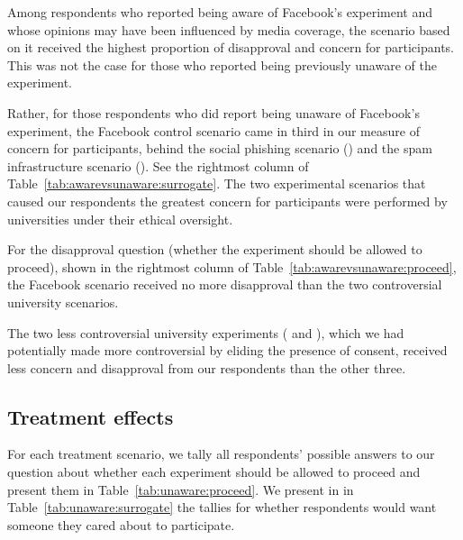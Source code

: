Among respondents who reported being aware of Facebook's experiment and whose opinions may have been influenced by media coverage, the scenario based on it received the highest proportion of disapproval and concern for participants.  This was not the case for those who reported being previously unaware of the experiment.

Rather, for those respondents who did report being unaware of Facebook's experiment, the Facebook control scenario came in third in our measure of concern for participants, behind the social phishing scenario () and the spam infrastructure scenario ().  See the rightmost column of Table~\ref{tab:awarevsunaware:surrogate}.
The two experimental scenarios that caused our respondents the greatest concern for participants were performed by universities under their ethical oversight.

For the disapproval question (whether the experiment should be allowed to proceed), shown in the rightmost column of Table~\ref{tab:awarevsunaware:proceed}, the Facebook scenario received no more disapproval than the two controversial university scenarios.

The two less controversial university experiments ( and ), which we had potentially made more controversial by eliding the presence of consent, received less concern and disapproval from our respondents than the other three.

\subsection{Treatment effects}
For each treatment scenario, we tally all respondents' possible answers to our question about whether each experiment should be allowed to proceed and present them in Table~\ref{tab:unaware:proceed}.  We present in in Table~\ref{tab:unaware:surrogate} the tallies for whether respondents would want someone they cared about to participate.


